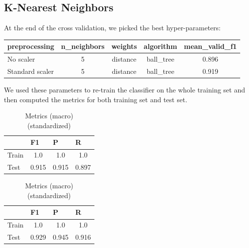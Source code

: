 \documentclass[12pt]{article}
\begin{document}
\subsection{K-Nearest Neighbors}
At the end of the cross validation, we picked the best hyper-parameters:
\begin{table}[h]
\centering
\begin{tabular}{lcccc}
\toprule
 preprocessing & n\_neighbors & weights & algorithm &  mean\_valid\_f1 \\
\midrule
No scaler &             5 & distance &              ball\_tree &            0.896 \\
Standard scaler                  &                        5 &             distance &              ball\_tree &            0.919 \\
\bottomrule
\end{tabular}
\end{table}

We used these parameters to re-train the classifier on the whole training set and then computed the metrics for both training set and test set. 

\begin{table}[ht]
\begin{minipage}[b]{0.5\linewidth}
\centering
    \vfill
    \begin{tabular}{@{}lccc@{}}
    \toprule
     & \multicolumn{1}{l}{F1} & \multicolumn{1}{l}{P} & \multicolumn{1}{l}{R } \\ \midrule
    Train & 1.0  & 1.0 & 1.0 \\
    Test & 0.915 & 0.915 & 0.897 \\ \bottomrule
    \end{tabular}
    \vfill

\caption{Metrics (macro)}
\label{table:knn_res}
\end{minipage}\hfill
\begin{minipage}[b]{0.5\linewidth}
\centering
    \vfill
    \begin{tabular}{@{}lccc@{}}
    \toprule
     & \multicolumn{1}{l}{F1} & \multicolumn{1}{l}{P} & \multicolumn{1}{l}{R } \\ \midrule
    Train & 1.0  & 1.0 & 1.0 \\
    Test & 0.929 & 0.945 & 0.916 \\ \bottomrule
    \end{tabular}
    \vfill
\caption{Metrics (macro) (standardized)}
\label{table:knn_res}
\end{minipage}\hfill
\end{table}
\end{document}
